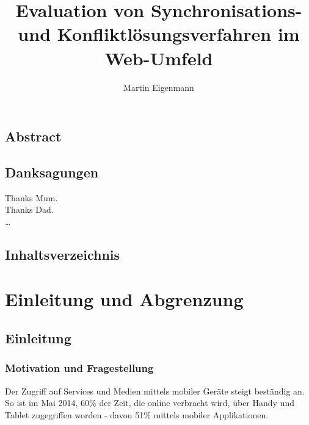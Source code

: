\documentclass[oneside,11pt,parskip=half,ngerman]{scrreprt}
\title{\bigskip \bigskip Evaluation von Synchronisations- und Konfliktlösungsverfahren im
Web-Umfeld}
\author{Martin Eigenmann}
\begin{document}
  
\maketitle


\chapter{Abstract}\label{abstract}

\chapter{Danksagungen}\label{danksagungen}

Thanks Mum.\\Thanks Dad.\\\ldots{}

\setcounter{tocdepth}{1}

\chapter{Inhaltsverzeichnis}\label{inhaltsverzeichnis}

\renewcommand{\contentsname}{} 

\begingroup\let\clearpage\relax
\tableofcontents
\endgroup


\newpage


\part[Teil i]{Einleitung und Abgrenzung}

\chapter{Einleitung}\label{einleitung}

\section{Motivation und
Fragestellung}\label{motivation-und-fragestellung}

Der Zugriff auf Services und Medien mittels mobiler Geräte steigt
beständig an. So ist im Mai 2014, 60\% der Zeit, die online verbracht
wird, über Handy und Tablet zugegriffen worden - davon 51\% mittels
mobiler Applikationen. \autocite{comescore-mobiletrends}
\end{document}
